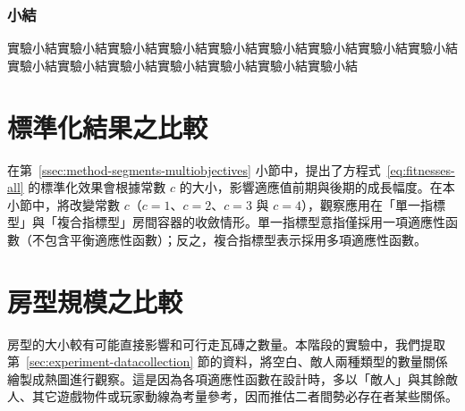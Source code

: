 \subsubsection{小結}
\label{sssec:experiment-results-trunk-summary}

實驗小結實驗小結實驗小結實驗小結實驗小結實驗小結實驗小結實驗小結實驗小結實驗小結實驗小結實驗小結實驗小結實驗小結實驗小結實驗小結



\section{標準化結果之比較}
\label{sec:experiment-normalized}

在第~\ref{ssec:method-segments-multiobjectives} 小節中，提出了方程式~\ref{eq:fitnesses-all} 的標準化效果會根據常數 $c$ 的大小，影響適應值前期與後期的成長幅度。在本小節中，將改變常數 $c$（$c = 1$、$c = 2$、$c = 3$ 與 $c = 4$），觀察應用在「單一指標型」與「複合指標型」房間容器的收斂情形。單一指標型意指僅採用一項適應性函數（不包含平衡適應性函數）；反之，複合指標型表示採用多項適應性函數。







\section{房型規模之比較}
\label{sec:experiment-density}

房型的大小較有可能直接影響和可行走瓦磚之數量。本階段的實驗中，我們提取第~\ref{sec:experiment-datacollection} 節的資料，將空白、敵人兩種類型的數量關係繪製成熱圖進行觀察。這是因為各項適應性函數在設計時，多以「敵人」與其餘敵人、其它遊戲物件或玩家動線為考量參考，因而推估二者間勢必存在者某些關係。





